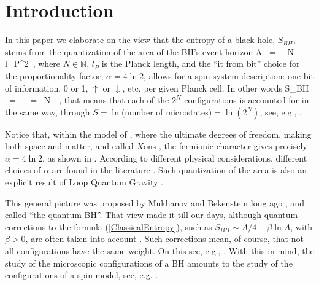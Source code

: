 \documentclass[aps,prd,showkeys,nofootinbib,superscriptaddress]{revtex4-2}
\begin{document}

 \maketitle


\section{Introduction}

In this paper we elaborate on the view that the entropy of a black hole, $S_{BH}$, stems from the quantization of the area of the BH's event horizon \cite{mukhanov,bekenstein2, bekenstein3}
\be
A  \ = \  \alpha \, N  \, l_P^2 \,,
\ee
where $N \in \mathbb{N}$, $l_P$ is the Planck length, and the ``it from bit'' \cite{wheelerit} choice for the proportionality factor, $\alpha = 4 \ln 2$, allows for a spin-system description: one bit of information, 0 or 1, $\uparrow$ or $\downarrow$, etc, per given Planck cell. In other words
\be \label{ClassicalEntropy}
S_{BH} \ = \  \ = \ N  \,  \,,
\ee
that means that each of the $2^N$ configurations is accounted for in the same way, through $S = \ln$(number of microstates)$= \ln (2^N)$, see, e.g., \cite{kiefer}.

Notice that, within the model of \cite{aischol}, where the ultimate degrees of freedom, making both space and matter, and called $X$ons \cite{Xons}, the fermionic character gives precisely $\alpha = 4 \ln 2$, as shown in \cite{aismal}. According to different physical considerations, different choices of $\alpha$ are found in the literature \cite{Hod:1998vk,maggiore_2008}. Such quantization of the area is also an explicit result of Loop Quantum Gravity \cite{Ashtekar:1997yu,Rovelli:2004tv}.

This general picture was proposed by Mukhanov and Bekenstein long ago \cite{mukhanov,bekenstein2, bekenstein3}, and called ``the quantum BH''. That view made it till our days, although quantum corrections to the formula (\ref{ClassicalEntropy}), such as $S_{BH} \sim A/4 - \beta \ln A$, with $\beta > 0$, are often taken into account \cite{Kaul:2000kf, Gupta:2001bg, Ghosh:2004rq, Majhi:2013tw, Singleton:2013ama, Ong:2018xna}. Such corrections mean, of course, that not all configurations have the same weight. On this see, e.g., \cite{kiefer}. With this in mind, the study of the microscopic configurations of a BH amounts to the study of the configurations of a spin model, see, e.g. \cite{kiefer}.
\end{document}
